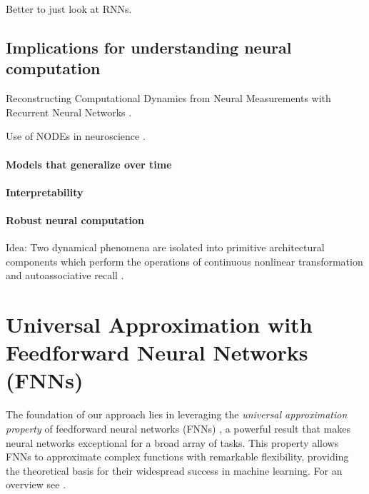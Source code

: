 \documentclass{article}
\theoremstyle{definition}
\theoremstyle{remark}
\newcounter{ct}
\begin{document}
Better to just look at RNNs. 


\subsection{Implications for understanding neural computation} 

Reconstructing Computational Dynamics from Neural Measurements with Recurrent Neural Networks \citep{durstewitz2023reconstructing}.

Use of NODEs in neuroscience \citep{kim2021inferring}.


\paragraph{Models that generalize over time}


\paragraph{Interpretability}%


\paragraph{Robust neural computation}
Idea: Two dynamical phenomena are isolated into primitive architectural components which perform the operations of continuous nonlinear transformation and autoassociative recall \citep{pineda1988dynamics}.




\newpage




\newpage
\appendix 

\section{Universal Approximation with Feedforward Neural Networks (FNNs)}\label{sec:uniapproxffn}

The foundation of our approach lies in leveraging the \textit{universal approximation property} of feedforward neural networks (FNNs) \citep{poggio1990networks}, a powerful result that makes neural networks exceptional for a broad array of tasks. This property allows FNNs to approximate complex functions with remarkable flexibility, providing the theoretical basis for their widespread success in machine learning.
For an overview see \citep{blum1991approximation,scarselli1998universal,augustine2024survey}.
\end{document}
